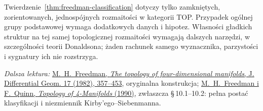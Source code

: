 Twierdzenie~\ref{thm:freedman-classification}
dotyczy tylko zamkniętych, zorientowanych,
jednospójnych rozmaitości w kategorii TOP.
Przypadek ogólnej grupy podstawowej wymaga
dodatkowych danych i hipotez. Własności gładkich
struktur na tej samej topologicznej rozmaitości
wymagają dalszych narzędzi, w szczególności
teorii Donaldsona; żaden rachunek samego
wyznacznika, parzystości i sygnatury ich nie rozstrzyga.

\par\smallskip
{\footnotesize\noindent\emph{Dalsza lektura:}
\href{https://www.maths.gla.ac.uk/~mpowell/1982_The%20topology%20of%20four-dimensional%20manifolds.pdf}
{M.\ H.\ Freedman, \emph{The topology of four-dimensional
manifolds}, J. Differential Geom. 17 (1982), 357--453},
oryginalna konstrukcja;
\href{https://archive.mpim-bonn.mpg.de/4789/2/FreedmanQuinn-TopologyOf4Manifolds-Reformatted2013.pdf}
{M.\ H.\ Freedman i F.\ Quinn, \emph{Topology of
4-Manifolds} (1990)}, zwłaszcza \S\,10.1--10.2:
pełna postać klasyfikacji i niezmiennik
Kirby'ego--Siebenmanna.\par}

